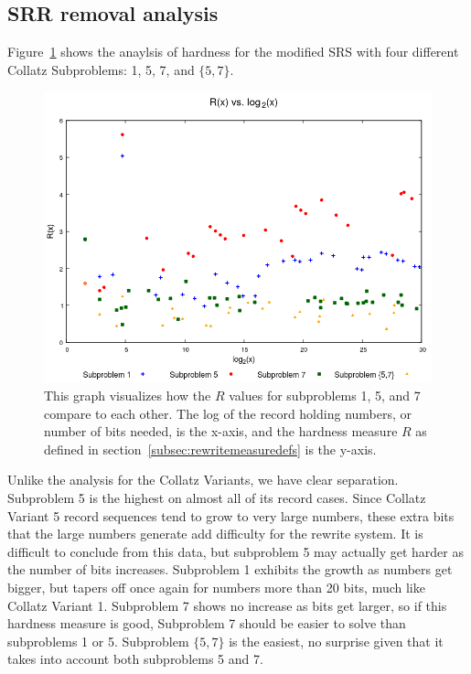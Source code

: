 \subsection{SRR removal analysis} \label{subsec:rewritehardness}
Figure~\ref{fig:rvslog} shows the anaylsis of hardness for the modified SRS with four different Collatz Subproblems: 1, 5, 7, and $\{5,7\}$. 
\begin{figure}
    \centering
    \includegraphics[scale=0.75]{ModAvoidanceAnalysisPics/R_vs_log.png}
    \caption{This graph visualizes how the $R$ values for subproblems 1, 5, and 7 compare to each other. The log of the record holding numbers, or number of bits needed, is the x-axis, and the hardness measure $R$ as defined in section~\ref{subsec:rewritemeasuredefs} is the y-axis.}
    \label{fig:rvslog}
\end{figure}
Unlike the analysis for the Collatz Variants, we have clear separation. Subproblem 5 is the highest on almost all of its record cases. Since Collatz Variant 5 record sequences tend to grow to very large numbers, these extra bits that the large numbers generate add difficulty for the rewrite system. It is difficult to conclude from this data, but subproblem 5 may actually get harder as the number of bits increases. Subproblem 1 exhibits the growth as numbers get bigger, but tapers off once again for numbers more than 20 bits, much like Collatz Variant 1. Subproblem 7 shows no increase as bits get larger, so if this hardness measure is good, Subproblem 7 should be easier to solve than subproblems 1 or 5. Subproblem $\{5,7\}$ is the easiest, no surprise given that it takes into account both subproblems 5 and 7.
